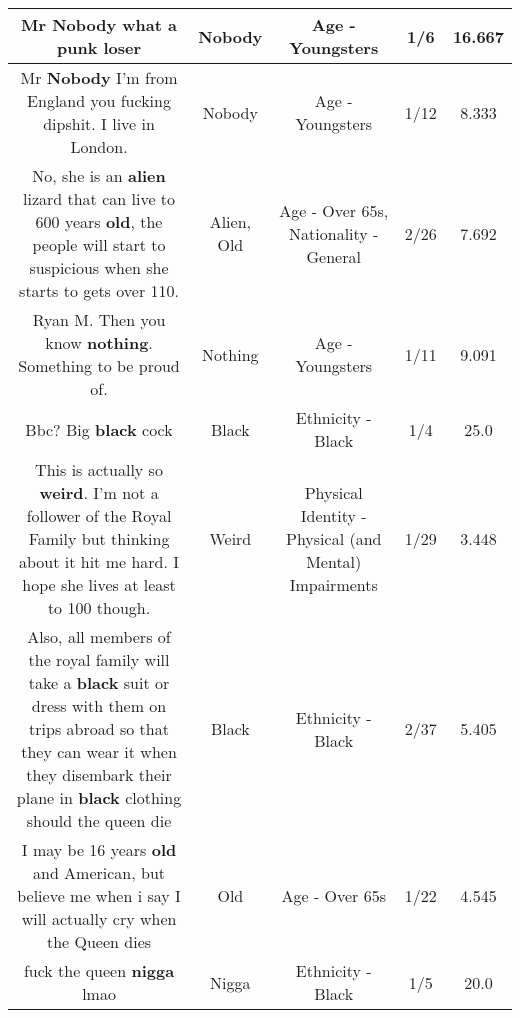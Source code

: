 \documentclass[11pt]{article}
\newlength\mylength
\begin{document}
\begin{center}
\begin{longtable}{|C{.65\mylength}|C{.30\mylength}|C{.12\mylength}|C{.12\mylength}|C{.12\mylength}|}
  \small Mr \textbf{Nobody} what a punk loser\normalsize   & Nobody & Age - Youngsters & 1/6 & 16.667 \\  \hline
  \small Mr \textbf{Nobody} I'm from England you fucking dipshit. I live in London.\normalsize   & Nobody & Age - Youngsters & 1/12 & 8.333 \\  \hline
  \small No, she is an \textbf{alien} lizard that can live to 600 years \textbf{old}, the people will start to suspicious when she starts to gets over 110.\normalsize   & Alien, Old & Age - Over 65s, Nationality - General & 2/26 & 7.692 \\  \hline
  \small Ryan M. Then you know \textbf{nothing}.  Something to be proud of.\normalsize   & Nothing & Age - Youngsters & 1/11 & 9.091 \\  \hline
  \small Bbc? Big \textbf{black} cock\normalsize   & Black & Ethnicity - Black & 1/4 & 25.0 \\  \hline
  \small This is actually so \textbf{weird}. I'm not a follower of the Royal Family but thinking about it hit me hard. I hope she lives at least to 100 though.\normalsize   & Weird & Physical Identity - Physical (and Mental) Impairments & 1/29 & 3.448 \\  \hline
  \small Also, all members of the royal family will take a \textbf{black} suit or dress with them on trips abroad so that they can wear it when they disembark their plane in \textbf{black} clothing should the queen die\normalsize   & Black & Ethnicity - Black & 2/37 & 5.405 \\  \hline
  \small I may be 16 years \textbf{old} and American, but believe me when i say I will actually cry when the Queen dies\normalsize   & Old & Age - Over 65s & 1/22 & 4.545 \\  \hline
  \small fuck the queen \textbf{nigga} lmao\normalsize   & Nigga & Ethnicity - Black & 1/5 & 20.0 \\  \hline

\end{longtable}
\end{center}
\end{document}
